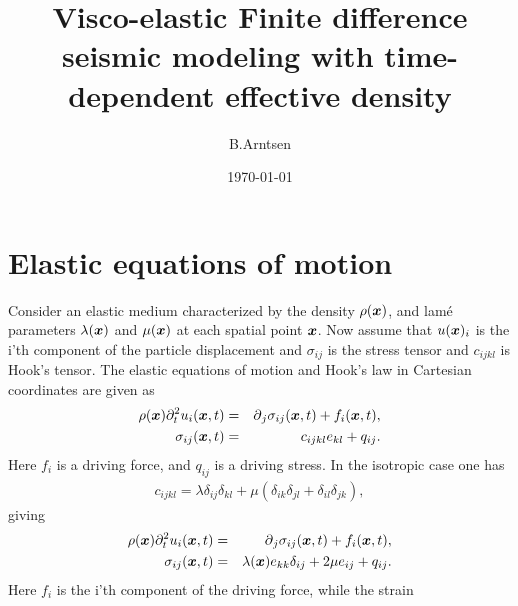 \documentclass[11pt]{article}
\begin{document}
  
%
\newcommand{\dt}[1]{\partial_t{#1}}
\newcommand{\ddt}[1]{\partial^2_t{#1}}
\newcommand{\dddt}[1]{\partial^3_t{#1}}
\newcommand{\inv}[1]{\frac{1}{#1}}
\newcommand{\diff}[1]{D^+_{#1}}
\newcommand{\difb}[1]{D^-_{#1}}
\title{Visco-elastic Finite difference seismic modeling with 
       time-dependent effective density}
\author{B.Arntsen}
\date{\today}
\maketitle
\clearpage
\section*{Elastic equations of motion} 
Consider an elastic medium characterized by the density $\rho(\mbox{\boldmath $x$})$, 
and lam\'{e}
parameters $\lambda(\mbox{\boldmath $x$})$ and $\mu(\mbox{\boldmath $x$})$ at each spatial point $\mbox{\boldmath $x$}$.
Now assume that $u(\mbox{\boldmath $x$})_i$ is the i'th component of the particle displacement 
and
$\sigma_{ij}$ is the stress tensor and $c_{ijkl}$ is Hook's tensor.
The elastic equations of motion and Hook's law in Cartesian coordinates are
given as
%
\begin{eqnarray}
  \rho(\xx) \ddt{u_i(\xx, t)} & = & \p_j \sigma_{ij}(\xx, t) +f_i(\xx,t),\\
					   \label{eq:el-eqm}
        \sigma_{ij}(\xx,t)    & = & c_{ijkl}e_{kl} +q_{ij}.
					  \label{eq:el-cse}
\end{eqnarray}
%
Here $f_i$ is a driving force, and $q_{ij}$ is a driving stress.
In the isotropic case one has
%
\begin{eqnarray}
   c_{ijkl} = \lambda\delta_{ij}\delta_{kl} + \mu\left(\delta_{ik}\delta_{jl} + \delta_{il}\delta_{jk}\right),
                                 \label{eq:el-moduli}
\end{eqnarray}
%
giving
%
\begin{eqnarray}
  \rho(\xx) \ddt{u_i(\xx, t)} & = & \p_j \sigma_{ij}(\xx, t) +f_i(\xx,t),\\
					   \label{eq:iso-elm}
  \sigma_{ij}(\xx, t) & = & 
        \lambda(\xx) e_{kk}\delta_{ij} + 2\mu e_{ij} +q_{ij}.
					  \label{eq:iso-cse}
\end{eqnarray}
%
Here $f_i$ is the i'th component of the driving force, while the strain
\end{document}
